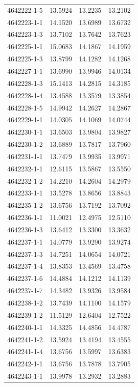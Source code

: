 \begin{longtable}{lrrr}
4642222-1-5 & 13.5924 & 13.2235 & 13.2102 \\
4642223-1-1 & 14.1520 & 13.6989 & 13.6732 \\
4642223-1-3 & 13.7102 & 13.7642 & 13.7623 \\
4642225-1-1 & 15.0683 & 14.1867 & 14.1959 \\
4642225-1-3 & 13.8799 & 14.1282 & 14.1268 \\
4642227-1-1 & 13.6990 & 13.9946 & 14.0134 \\
4642228-1-3 & 15.1413 & 14.2815 & 14.3185 \\
4642228-1-4 & 13.4588 & 13.3579 & 13.3854 \\
4642228-1-5 & 14.9942 & 14.2627 & 14.2867 \\
4642229-1-1 & 14.0305 & 14.1069 & 14.0744 \\
4642230-1-1 & 13.6503 & 13.9804 & 13.9827 \\
4642230-1-2 & 13.6889 & 13.7817 & 13.7960 \\
4642231-1-1 & 13.7479 & 13.9935 & 13.9971 \\
4642232-1-1 & 12.6115 & 13.5867 & 13.5550 \\
4642232-1-2 & 14.2210 & 14.2604 & 14.2979 \\
4642233-1-1 & 13.5278 & 13.8656 & 13.8843 \\
4642235-1-2 & 13.6756 & 13.7192 & 13.7092 \\
4642236-1-1 & 11.0021 & 12.4975 & 12.5110 \\
4642236-1-3 & 13.6412 & 13.3300 & 13.3632 \\
4642237-1-1 & 14.0779 & 13.9290 & 13.9274 \\
4642237-1-3 & 14.7251 & 14.0654 & 14.0721 \\
4642237-1-4 & 13.8353 & 13.4569 & 13.4758 \\
4642237-1-6 & 14.4884 & 14.1212 & 14.1139 \\
4642237-1-7 & 14.3482 & 13.9326 & 13.9584 \\
4642238-1-2 & 13.7439 & 14.1100 & 14.1579 \\
4642239-1-2 & 11.5129 & 12.6404 & 12.7522 \\
4642240-1-1 & 14.3325 & 14.4856 & 14.4787 \\
4642241-1-2 & 13.5924 & 13.4194 & 13.4555 \\
4642241-1-4 & 13.6756 & 13.5997 & 13.6383 \\
4642242-1-1 & 13.6756 & 13.7878 & 13.7905 \\
4642243-1-1 & 13.9978 & 13.2932 & 13.2883 \\

\end{longtable}
